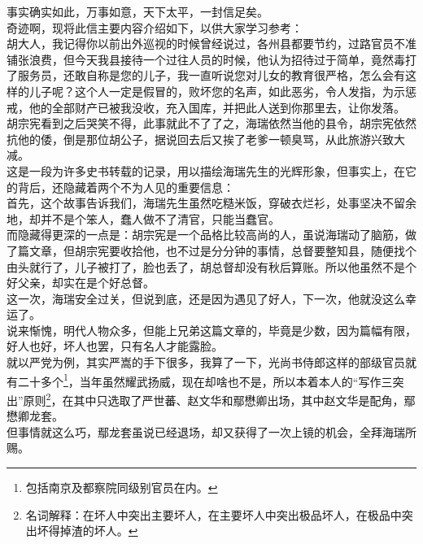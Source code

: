 \begin{multicols}{\theparacolNo}
事实确实如此，万事如意，天下太平，一封信足矣。\\

奇迹啊，现将此信主要内容介绍如下，以供大家学习参考：\\

胡大人，我记得你以前出外巡视的时候曾经说过，各州县都要节约，过路官员不准铺张浪费，但今天我县接待一个过往人员的时候，他认为招待过于简单，竟然毒打了服务员，还敢自称是您的儿子，我一直听说您对儿女的教育很严格，怎么会有这样的儿子呢？这个人一定是假冒的，败坏您的名声，如此恶劣，令人发指，为示惩戒，他的全部财产已被我没收，充入国库，并把此人送到你那里去，让你发落。\\

胡宗宪看到之后哭笑不得，此事就此不了了之，海瑞依然当他的县令，胡宗宪依然抗他的倭，倒是那位胡公子，据说回去后又挨了老爹一顿臭骂，从此旅游兴致大减。\\

这是一段为许多史书转载的记录，用以描绘海瑞先生的光辉形象，但事实上，在它的背后，还隐藏着两个不为人见的重要信息：\\

首先，这个故事告诉我们，海瑞先生虽然吃糙米饭，穿破衣烂衫，处事坚决不留余地，却并不是个笨人，蠢人做不了清官，只能当蠢官。\\

而隐藏得更深的一点是：胡宗宪是一个品格比较高尚的人，虽说海瑞动了脑筋，做了篇文章，但胡宗宪要收拾他，也不过是分分钟的事情，总督要整知县，随便找个由头就行了，儿子被打了，脸也丢了，胡总督却没有秋后算账。所以他虽然不是个好父亲，却实在是个好总督。\\

这一次，海瑞安全过关，但说到底，还是因为遇见了好人，下一次，他就没这么幸运了。\\

说来惭愧，明代人物众多，但能上兄弟这篇文章的，毕竟是少数，因为篇幅有限，好人也好，坏人也罢，只有名人才能露脸。\\

就以严党为例，其实严嵩的手下很多，我算了一下，光尚书侍郎这样的部级官员就有二十多个\footnote{包括南京及都察院同级别官员在内。}，当年虽然耀武扬威，现在却啥也不是，所以本着本人的“写作三突出”原则\footnote{名词解释：在坏人中突出主要坏人，在主要坏人中突出极品坏人，在极品中突出坏得掉渣的坏人。}，在其中只选取了严世蕃、赵文华和鄢懋卿出场，其中赵文华是配角，鄢懋卿龙套。\\

但事情就这么巧，鄢龙套虽说已经退场，却又获得了一次上镜的机会，全拜海瑞所赐。\\


\end{multicols}
